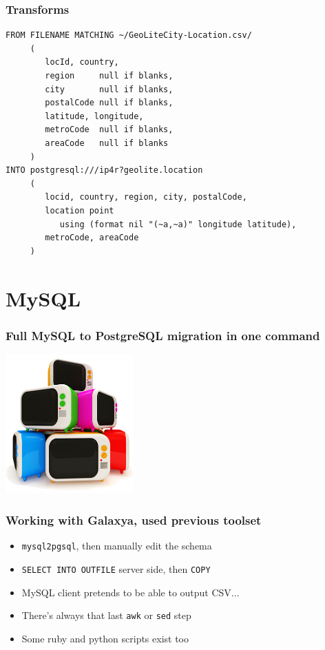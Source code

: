\documentclass{beamer}
\begin{document}
\begin{frame}[fragile]
  \frametitle{Transforms}

  \begin{verbatim}
FROM FILENAME MATCHING ~/GeoLiteCity-Location.csv/
     (
        locId, country,
        region     null if blanks,
        city       null if blanks,
        postalCode null if blanks,
        latitude, longitude,
        metroCode  null if blanks,
        areaCode   null if blanks
     )
INTO postgresql:///ip4r?geolite.location
     (
        locid, country, region, city, postalCode,
        location point
           using (format nil "(~a,~a)" longitude latitude),
        metroCode, areaCode
     )
  \end{verbatim}
\end{frame}

\section{MySQL}

\begin{frame}
  \frametitle{Full MySQL to PostgreSQL migration in one command}

  
  \begin{center}
    \includegraphics[height=2.1in]{tv.png}
  \end{center}
\end{frame}

\begin{frame}[fragile]
  \frametitle{Working with Galaxya, used previous toolset}
  
  \vfill

  \begin{itemize}
  \item \texttt{mysql2pgsql}, then manually edit the schema
  \item \texttt{SELECT INTO OUTFILE} server side, then \texttt{COPY}
  \item MySQL client pretends to be able to output CSV...
  \item There's always that last \texttt{awk} or \texttt{sed} step
  \item Some ruby and python scripts exist too
  \end{itemize}  
\end{frame}
\end{document}
